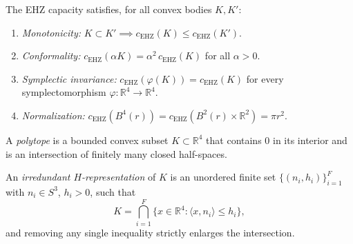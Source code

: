 \begin{lemma}\label{lem:capacity-axioms}
The EHZ capacity satisfies, for all convex bodies $K, K'$:
\begin{enumerate}
\item \emph{Monotonicity:} $K \subset K' \implies c_{\mathrm{EHZ}}(K) \leq c_{\mathrm{EHZ}}(K')$.
\item \emph{Conformality:} $c_{\mathrm{EHZ}}(\alpha K) = \alpha^2\, c_{\mathrm{EHZ}}(K)$
  for all $\alpha > 0$.
\item \emph{Symplectic invariance:}
  $c_{\mathrm{EHZ}}(\varphi(K)) = c_{\mathrm{EHZ}}(K)$
  for every symplectomorphism $\varphi \colon \mathbb{R}^4 \to \mathbb{R}^4$.
\item \emph{Normalization:}
  $c_{\mathrm{EHZ}}(B^4(r)) = c_{\mathrm{EHZ}}(B^2(r) \times \mathbb{R}^2) = \pi r^2$.
\end{enumerate}
\end{lemma}


\begin{definition}[Polytope]\label{def:polytope}
A \emph{polytope} is a bounded convex subset
$K \subset \mathbb{R}^4$ that contains $0$ in its interior and is an
intersection of finitely many closed half-spaces.

An \emph{irredundant $H$-representation} of $K$ is an unordered
finite set $\{(n_i, h_i)\}_{i=1}^{F}$ with
$n_i \in S^3$, $h_i > 0$, such that
\[
  K = \bigcap_{i=1}^{F} \{ x \in \mathbb{R}^4 : \langle x, n_i \rangle \leq h_i \},
\]
and removing any single inequality strictly enlarges the intersection.
\end{definition}

